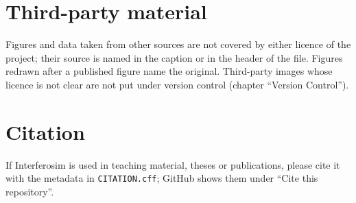 \section{Third-party material}

Figures and data taken from other sources are not covered by either
licence of the project; their source is named in the caption or in the
header of the file. Figures redrawn after a published figure name the
original. Third-party images whose licence is not clear are not put
under version control (chapter \enquote{Version Control}).

\section{Citation}

If Interferosim is used in teaching material, theses or publications,
please cite it with the metadata in \texttt{CITATION.cff}; GitHub shows
them under \enquote{Cite this repository}.
